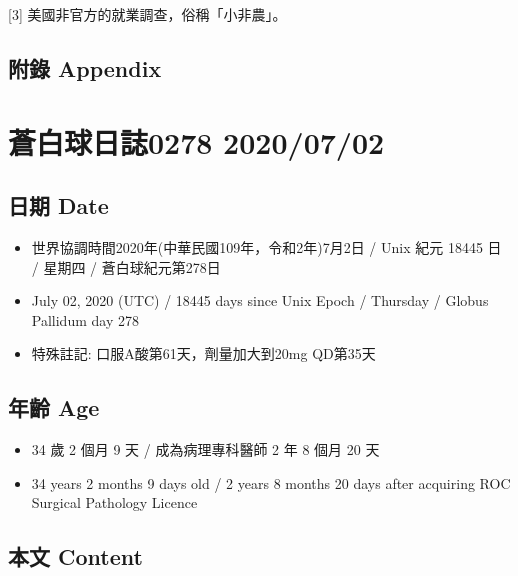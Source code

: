 \documentclass[a5paper, 11pt
]{book}
\providecommand{\tightlist}{%
  \setlength{\itemsep}{0pt}\setlength{\parskip}{0pt}}
\begin{document}
{[}3{]} 美國非官方的就業調查，俗稱「小非農」。

\hypertarget{ux9644ux9304-appendix-26}{%
\subsection{附錄 Appendix}\label{ux9644ux9304-appendix-26}}

\hypertarget{ux84bcux767dux7403ux65e5ux8a8c0278-20200702}{%
\section{蒼白球日誌0278
2020/07/02}\label{ux84bcux767dux7403ux65e5ux8a8c0278-20200702}}

\hypertarget{ux65e5ux671f-date-27}{%
\subsection{日期 Date}\label{ux65e5ux671f-date-27}}

\begin{itemize}
\tightlist
\item
  世界協調時間2020年(中華民國109年，令和2年)7月2日 / Unix 紀元 18445 日
  / 星期四 / 蒼白球紀元第278日
\item
  July 02, 2020 (UTC) / 18445 days since Unix Epoch / Thursday / Globus
  Pallidum day 278
\item
  特殊註記: 口服A酸第61天，劑量加大到20mg QD第35天
\end{itemize}

\hypertarget{ux5e74ux9f61-age-27}{%
\subsection{年齡 Age}\label{ux5e74ux9f61-age-27}}

\begin{itemize}
\tightlist
\item
  34 歲 2 個月 9 天 / 成為病理專科醫師 2 年 8 個月 20 天
\item
  34 years 2 months 9 days old / 2 years 8 months 20 days after
  acquiring ROC Surgical Pathology Licence
\end{itemize}

\hypertarget{ux672cux6587-content-27}{%
\subsection{本文 Content}\label{ux672cux6587-content-27}}
\end{document}
